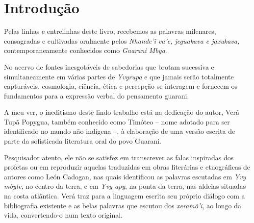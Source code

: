 
\chapter{Introdução}

Pelas linhas e entrelinhas deste livro, recebemos as palavras milenares,
consagradas e cultivadas oralmente pelos \emph{Nhande’i va’e, jeguakava e jaxukava,}
contemporaneamente conhecidos como \emph{Guarani Mbya}.

No acervo de fontes
inesgotáveis de sabedorias que brotam sucessiva e simultaneamente em várias
partes de \emph{Yvyrupa} e que jamais serão totalmente capturáveis, cosmologia,
ciência, ética e percepção se interagem e fornecem os fundamentos para a
expressão verbal do pensamento guarani.

A meu ver, o ineditismo deste lindo
trabalho está na dedicação do autor, Verá Tupã Popygua, também conhecido como
Timóteo – nome adotado para ser identificado no mundo não indígena –, à
elaboração de uma versão escrita de parte da sofisticada literatura oral do
povo Guarani.

Pesquisador atento, ele não se satisfez em transcrever as falas
inspiradas dos profetas ou em reproduzir aquelas traduzidas em obras literárias
e etnográficas de autores como León Cadogan, nas quais identificou as palavras
escutadas em \emph{Yvy mbyte}, no centro da terra, e em \emph{Yvy apy}, na ponta da terra,
nas aldeias situadas na costa atlântica. Verá traz para a linguagem escrita seu
próprio diálogo com a bibliografia existente e as belas palavras que escutou
dos \emph{xeramõ’i}, ao longo da vida, convertendo-o num texto original.

